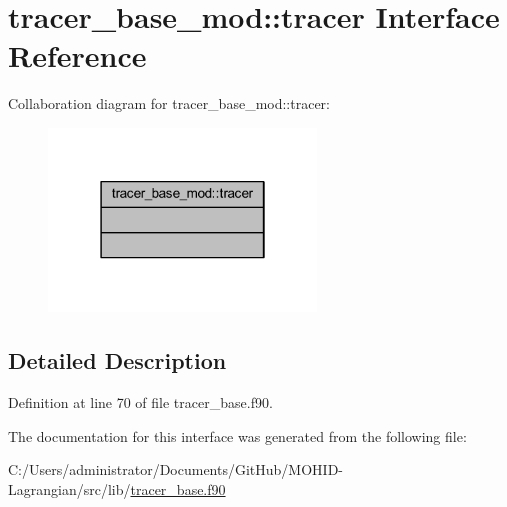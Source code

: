 \hypertarget{interfacetracer__base__mod_1_1tracer}{}\section{tracer\+\_\+base\+\_\+mod\+:\+:tracer Interface Reference}
\label{interfacetracer__base__mod_1_1tracer}


Collaboration diagram for tracer\+\_\+base\+\_\+mod\+:\+:tracer\+:
\nopagebreak
\begin{figure}[H]
\begin{center}
\leavevmode
\includegraphics[width=202pt]{interfacetracer__base__mod_1_1tracer__coll__graph}
\end{center}
\end{figure}


\subsection{Detailed Description}


Definition at line 70 of file tracer\+\_\+base.\+f90.



The documentation for this interface was generated from the following file\+:\begin{DoxyCompactItemize}
\item 
C\+:/\+Users/administrator/\+Documents/\+Git\+Hub/\+M\+O\+H\+I\+D-\/\+Lagrangian/src/lib/\mbox{\hyperlink{tracer__base_8f90}{tracer\+\_\+base.\+f90}}\end{DoxyCompactItemize}
